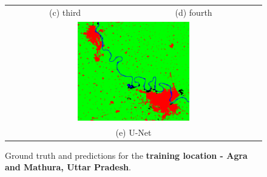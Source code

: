\documentclass[12pt, a4paper]{report}
\begin{document}
\begin{figure}
\begin{center}
\begin{tabular}{cc}
(c) third & (d) fourth \\[6pt]
\multicolumn{2}{c}{\includegraphics[width=0.45\textwidth]{train_cnn} }\\
\multicolumn{2}{c}{(e) U-Net}
\end{tabular}
\caption{Ground truth and predictions for the \textbf{training location - Agra and Mathura, Uttar Pradesh}.}
\end{center}
\end{figure}
\end{document}

